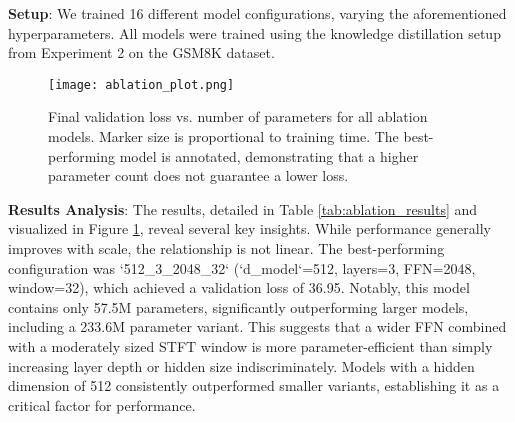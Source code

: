 \documentclass[11pt,a4paper]{article}
\begin{document}
\textbf{Setup}: We trained 16 different model configurations, varying the aforementioned hyperparameters. All models were trained using the knowledge distillation setup from Experiment 2 on the GSM8K dataset.

\begin{figure}[h]
\centering
\texttt{[image: ablation\_plot.png]} %
\caption{Final validation loss vs. number of parameters for all ablation models. Marker size is proportional to training time. The best-performing model is annotated, demonstrating that a higher parameter count does not guarantee a lower loss.}
\label{fig:ablation_plot}
\end{figure}

\textbf{Results Analysis}: The results, detailed in Table \ref{tab:ablation_results} and visualized in Figure \ref{fig:ablation_plot}, reveal several key insights. While performance generally improves with scale, the relationship is not linear. The best-performing configuration was `512_3_2048_32` (`d_model`=512, layers=3, FFN=2048, window=32), which achieved a validation loss of 36.95. Notably, this model contains only 57.5M parameters, significantly outperforming larger models, including a 233.6M parameter variant. This suggests that a wider FFN combined with a moderately sized STFT window is more parameter-efficient than simply increasing layer depth or hidden size indiscriminately. Models with a hidden dimension of 512 consistently outperformed smaller variants, establishing it as a critical factor for performance.
\end{document}
